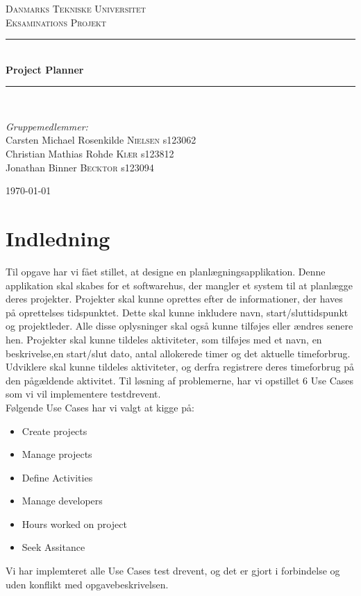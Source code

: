 \documentclass[a4paper,12pt]{article}
\title{
\HRule \\
\textsc{\doctitle} \\
	 \small{\textsl{\docsubtitle}}
\HRule
}
\author{\docauthor\\\small{\docplace}}
\date{\docdate}
\newcommand{\HRule}{\rule{\linewidth}{0.5mm}}
\begin{document}
\begin{titlepage}
\begin{center}
\textsc{\LARGE Danmarks Tekniske Universitet}\\[1.5cm]
\textsc{\large Eksaminations Projekt}\\[0.5cm]
\HRule \\[0.4cm]
{ \huge \bfseries Project Planner}\\[0.1cm]
\HRule \\[1.5cm]
\end{center}
\begin{flushleft} \large
\emph{Gruppemedlemmer:}\\
Carsten Michael Rosenkilde \textsc{Nielsen} s123062\\
Christian Mathias Rohde \textsc{Kiær} s123812\\
Jonathan Binner \textsc{Becktor} s123094\\
\end{flushleft}
\vfill 
\begin{center}
{\large \today}
\end{center}
\end{titlepage}
\section*{Indledning}
Til opgave har vi fået stillet, at designe en planlægningsapplikation. Denne applikation skal skabes for et softwarehus, der mangler et system til at planlægge deres projekter. Projekter skal kunne oprettes efter de informationer, der haves på oprettelses tidspunktet. Dette skal kunne inkludere navn, start/sluttidspunkt og projektleder. Alle disse oplysninger skal også kunne tilføjes eller ændres senere hen. Projekter skal kunne tildeles aktiviteter, som tilføjes med et navn, en beskrivelse,en start/slut dato, antal  allokerede timer og det aktuelle timeforbrug. Udviklere skal kunne tildeles aktiviteter, og derfra registrere deres timeforbrug på den pågældende aktivitet. Til løsning af problemerne, har vi opstillet 6 Use Cases som vi vil implementere testdrevent.  \\
Følgende Use Cases har vi valgt at kigge på: 
\begin{itemize}
\item Create projects
\item Manage projects
\item Define Activities
\item Manage developers
\item Hours worked on project
\item Seek Assitance
\end{itemize}
Vi har implemteret alle Use Cases test drevent, og det er gjort i forbindelse og uden konflikt med opgavebeskrivelsen.
\newpage
\tableofcontents
\newpage
\end{document}
